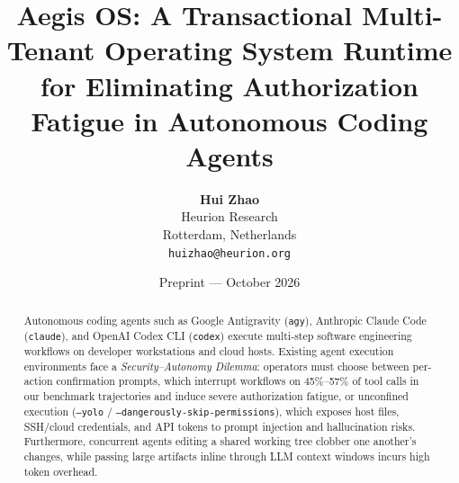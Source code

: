 \documentclass[10pt,twocolumn]{article}
\title{\LARGE \textbf{Aegis OS: A Transactional Multi-Tenant Operating System Runtime for Eliminating Authorization Fatigue in Autonomous Coding Agents}}
\author{
  \textbf{Hui Zhao} \\
  Heurion Research \\
  Rotterdam, Netherlands \\
  \texttt{huizhao@heurion.org}
}
\date{Preprint --- October 2026}
\begin{document}
\maketitle

\begin{abstract}
Autonomous coding agents such as Google Antigravity (\texttt{agy}), Anthropic Claude Code (\texttt{claude}), and OpenAI Codex CLI (\texttt{codex}) execute multi-step software engineering workflows on developer workstations and cloud hosts. Existing agent execution environments face a \emph{Security--Autonomy Dilemma}: operators must choose between per-action confirmation prompts, which interrupt workflows on 45\%--57\% of tool calls in our benchmark trajectories and induce severe authorization fatigue, or unconfined execution (\texttt{--yolo} / \texttt{--dangerously-skip-permissions}), which exposes host files, SSH/cloud credentials, and API tokens to prompt injection and hallucination risks. Furthermore, concurrent agents editing a shared working tree clobber one another's changes, while passing large artifacts inline through LLM context windows incurs high token overhead.


\end{abstract}
\end{document}

